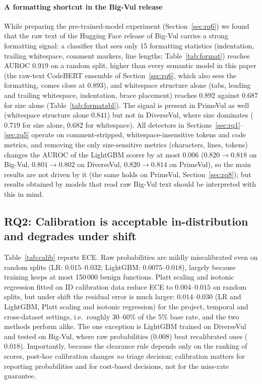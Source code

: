 \paragraph{A formatting shortcut in the Big-Vul release} While preparing the pre-trained-model experiment (Section~\ref{sec:rq6}) we found that the raw text of the Hugging Face release of Big-Vul carries a strong formatting signal: a classifier that sees only 15 formatting statistics (indentation, trailing whitespace, comment markers, line lengths; Table~\ref{tab:format}) reaches AUROC $0.919$ on a random split, higher than every semantic model in this paper (the raw-text CodeBERT ensemble of Section~\ref{sec:rq6}, which also sees the formatting, comes close at $0.893$), and whitespace structure alone (tabs, leading and trailing whitespace, indentation, brace placement) reaches $0.892$ against $0.687$ for size alone (Table~\ref{tab:formatabl}). The signal is present in PrimeVul as well (whitespace structure alone $0.841$) but not in DiverseVul, where size dominates ($0.719$ for size alone, $0.682$ for whitespace). All detectors in Sections~\ref{sec:rq1}--\ref{sec:rq5} operate on comment-stripped, whitespace-insensitive tokens and code metrics, and removing the only size-sensitive metrics (characters, lines, tokens) changes the AUROC of the LightGBM scorer by at most $0.006$ ($0.820\to0.818$ on Big-Vul, $0.801\to0.802$ on DiverseVul, $0.820\to0.814$ on PrimeVul), so the main results are not driven by it (the same holds on PrimeVul, Section~\ref{sec:rq8}); but results obtained by models that read raw Big-Vul text should be interpreted with this in mind.

\subsection{RQ2: Calibration is acceptable in-distribution and degrades under shift}\label{sec:rq2}
Table~\ref{tab:calib} reports ECE. Raw probabilities are mildly miscalibrated even on random splits (LR: $0.015$--$0.032$; LightGBM: $0.0075$--$0.018$), largely because training keeps at most 150\,000 benign functions. Platt scaling and isotonic regression fitted on ID calibration data reduce ECE to $0.004$--$0.015$ on random splits, but under shift the residual error is much larger: $0.014$--$0.030$ (LR and LightGBM, Platt scaling and isotonic regression) for the project, temporal and cross-dataset settings, i.e.\ roughly $30$--$60\%$ of the 5\% base rate, and the two methods perform alike. The one exception is LightGBM trained on DiverseVul and tested on Big-Vul, where raw probabilities ($0.008$) beat recalibrated ones ($0.018$). Importantly, because the clearance rule depends only on the ranking of scores, post-hoc calibration changes \emph{no} triage decision; calibration matters for reporting probabilities and for cost-based decisions, not for the miss-rate guarantee.


